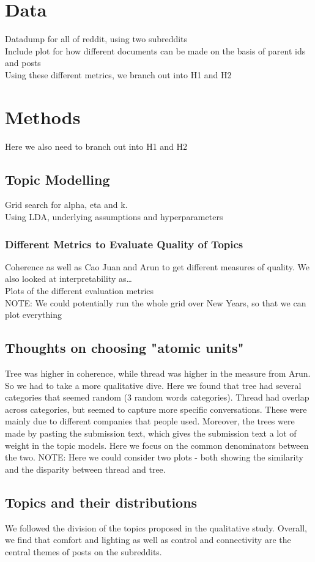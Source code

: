 \documentclass{article}
\begin{document}
    \section{Data}
    Datadump for all of reddit, using two subreddits\\
    Include plot for how different documents can be made on the basis of parent ids and posts \\
    Using these different metrics, we branch out into H1 and H2
    \section{Methods}
    Here we also need to branch out into H1 and H2
    \subsection{Topic Modelling}
    Grid search for alpha, eta and k. \\
    Using LDA, underlying assumptions and hyperparameters \\
    \subsubsection{Different Metrics to Evaluate Quality of Topics}
    Coherence as well as Cao Juan and Arun to get different measures of quality. We also looked at interpretability as\dots \\
    Plots of the different evaluation metrics \\
    NOTE: We could potentially run the whole grid over New Years, so that we can plot everything 
    \subsection{Thoughts on choosing "atomic units"}
    Tree was higher in coherence, while thread was higher in the measure from Arun. So we had to take a more qualitative dive. Here we found that tree had several categories that seemed random (3 random words categories). Thread had overlap across categories, but seemed to capture more specific conversations. These were mainly due to different companies that people used. Moreover, the trees were made by pasting the submission text, which gives the submission text a lot of weight in the topic models. Here we focus on the common denominators between the two. 
    NOTE: Here we could consider two plots - both showing the similarity and the disparity between thread and tree. 
    \subsection{Topics and their distributions}
    We followed the division of the topics proposed in the qualitative study. Overall, we find that comfort and lighting as well as control and connectivity are the central themes of posts on the subreddits. 
\end{document}
